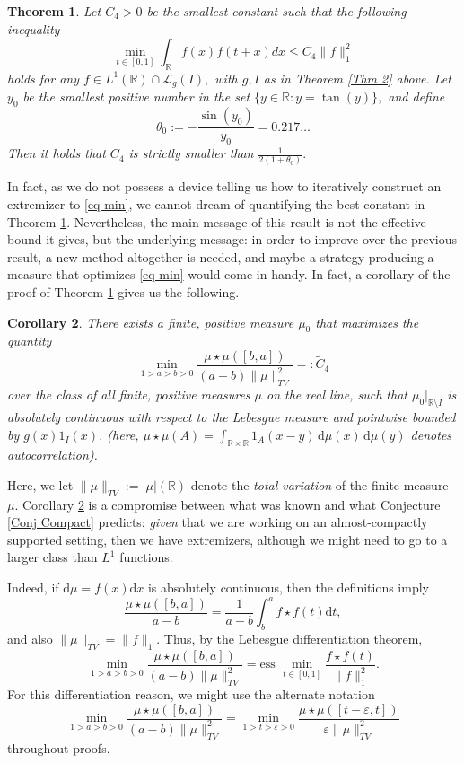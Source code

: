 \documentclass[11pt, reqno]{amsart}
\newcommand{\mmd}{ \mathrm{d}}
\newcommand{\s}{\star}
\numberwithin{equation}{section}
\newtheorem{theorem}{Theorem}[section]
\newtheorem{corollary}[theorem]{Corollary}
\newcommand{\R}{{\mathbb R}}
\newcommand{\eps}{{\varepsilon}}
\begin{document}
\begin{theorem}\label{Thm 4}
Let $C_4>0$ be the smallest constant such that the following inequality
\begin{equation}\label{eq min}
\min_{t\in[0,1]}\int_{\R}f(x)f(t+x)dx\leq C_4\|f\|_1^{2}
\end{equation}
holds for any $f\in L^{1}(\R) \cap \mathcal{L}_g(I),$ with $g,I$ as in Theorem \ref{Thm 2} above. Let $y_0$ be the smallest positive number in the set $\{ y \in \R \colon y = \tan (y)\},$ and define 
\[
\theta_0 := - \frac{\sin(y_0)}{y_0} = 0.217\dots 
\]
Then it holds that $C_4$ is \emph{strictly} smaller than $\frac{1}{2(1+\theta_0)}.$ 
\end{theorem}
In fact, as we  do not possess a device telling us how to iteratively construct an extremizer to \eqref{eq min}, we cannot dream of quantifying the best constant in Theorem \ref{Thm 4}. Nevertheless, the main message of 
this result is not the effective bound it gives, but the underlying message: in order to improve over the previous result, a new method altogether is needed, and maybe a strategy producing a measure that optimizes \eqref{eq min} 
would come in handy. In fact, a corollary of the proof of Theorem \ref{Thm 4} gives us the following. 

\begin{corollary}\label{Thm 5} There exists a finite, positive measure $\mu_0$ that maximizes the quantity 
\begin{equation}\label{eq min measure} 
\min_{1 > a > b > 0} \frac{ \mu \star \mu ( [b,a])}{(a-b) \|\mu\|_{TV}^2} =: \tilde{C}_4
\end{equation}
over the class of all finite, positive measures $\mu$ on the real line, such that $\mu_0|_{\R \setminus I}$ is absolutely continuous with respect to the Lebesgue measure and pointwise bounded by $g(x) 1_I(x)$. (here, $\mu \star \mu (A) = \int_{\R \times \R} 1_A(x-y) \, \mmd \mu(x) \, \mmd \mu (y)$ denotes autocorrelation). 
\end{corollary}

Here, we let $\|\mu\|_{TV} := |\mu|(\R)$ denote the \emph{total variation} of the finite measure $\mu$. Corollary \ref{Thm 5} is a compromise between what was known and what Conjecture \ref{Conj Compact} predicts: \emph{given} that we are working on an almost-compactly supported setting, then we have extremizers, although we might need to go to a larger class than $L^1$ functions. 

Indeed, if $\mmd \mu = f(x) \mmd x$ is absolutely continuous, then the definitions imply
\[
\frac{\mu \s \mu ([b,a])}{a-b} = \frac{1}{a-b} \int_b^a f \s f (t) \mmd t,
\]
and also $\|\mu\|_{TV} = \|f\|_1.$ Thus, by the Lebesgue differentiation theorem,
\[
\min_{1 > a > b > 0} \frac{ \mu \star \mu ( [b,a])}{(a-b) \|\mu\|_{TV}^2} = \text{ess } \min_{t \in [0,1]} \frac{f\s f(t)}{\|f\|_1^2}.
\]
For this differentiation reason, we might use the alternate notation 
\[
\min_{1 > a > b > 0} \frac{ \mu \star \mu ( [b,a])}{(a-b) \|\mu\|_{TV}^2}  = \min_{1> t > \eps > 0} \frac{\mu \s \mu ([t-\eps,t])}{\eps \|\mu\|_{TV}^2}
\]
throughout proofs. \\
\end{document}
